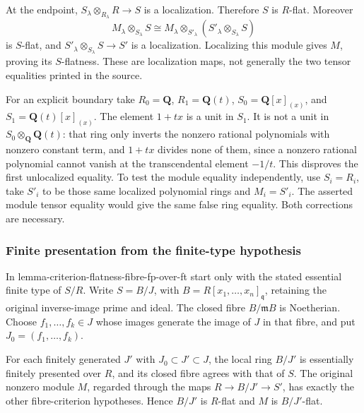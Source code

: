 At the endpoint, \(S_\lambda\otimes_{R_\lambda}R\to S\) is a localization. Therefore \(S\) is \(R\)-flat. Moreover \[
M_\lambda\otimes_{S_\lambda}S
 \cong M_\lambda\otimes_{S'_\lambda}(S'_\lambda\otimes_{S_\lambda}S)
\] is \(S\)-flat, and \(S'_\lambda\otimes_{S_\lambda}S\to S'\) is a localization. Localizing this module gives \(M\), proving its \(S\)-flatness. These are localization maps, not generally the two tensor equalities printed in the source.

For an explicit boundary take \(R_0=\mathbf Q\), \(R_1=\mathbf Q(t)\), \(S_0=\mathbf Q[x]_{(x)}\), and \(S_1=\mathbf Q(t)[x]_{(x)}\). The element \(1+tx\) is a unit in \(S_1\). It is not a unit in \(S_0\otimes_{\mathbf Q}\mathbf Q(t)\): that ring only inverts the nonzero rational polynomials with nonzero constant term, and \(1+tx\) divides none of them, since a nonzero rational polynomial cannot vanish at the transcendental element \(-1/t\). This disproves the first unlocalized equality. To test the module equality independently, use \(S_i=R_i\), take \(S'_i\) to be those same localized polynomial rings and \(M_i=S'_i\). The asserted module tensor equality would give the same false ring equality. Both corrections are necessary.

\subsubsection{Finite presentation from the finite-type hypothesis}\label{algebra-proof-038-finite-presentation-from-the-finite-type-hypothesis}

In lemma-\AlgebraIdentifierBreak{}criterion-\AlgebraIdentifierBreak{}flatness-\AlgebraIdentifierBreak{}fibre-\AlgebraIdentifierBreak{}fp-\AlgebraIdentifierBreak{}over-\AlgebraIdentifierBreak{}ft start only with the stated essential finite type of \(S/R\). Write \(S=B/J\), with \(B=R[x_1,\ldots,x_n]_{\mathfrak q}\), retaining the original inverse-image prime and ideal. The closed fibre \(B/\mathfrak mB\) is Noetherian. Choose \(f_1,\ldots,f_k\in J\) whose images generate the image of \(J\) in that fibre, and put \(J_0=(f_1,\ldots,f_k)\).

For each finitely generated \(J'\) with \(J_0\subset J'\subset J\), the local ring \(B/J'\) is essentially finitely presented over \(R\), and its closed fibre agrees with that of \(S\). The original nonzero module \(M\), regarded through the maps \(R\to B/J'\to S'\), has exactly the other fibre-criterion hypotheses. Hence \(B/J'\) is \(R\)-flat and \(M\) is \(B/J'\)-flat.


